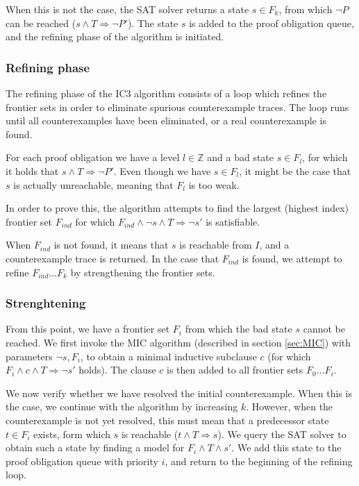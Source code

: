 \documentclass[a4paper]{article}
\begin{document}
When this is not the case, the SAT solver returns a state $s \in F_k$, from which $\lnot P$ can be reached ($s \land T \Rightarrow \lnot P'$). The state $s$ is added to the proof obligation queue, and the refining phase of the algorithm is initiated.

\subsubsection{Refining phase}
The refining phase of the IC3 algorithm consists of a loop which refines the frontier sets in order to eliminate spurious counterexample traces. The loop runs until all counterexamples have been eliminated, or a real counterexample is found.

For each proof obligation we have a level $l \in \mathbb{Z}$ and a bad state $s \in F_l$, for which it holds that $s \land T \Rightarrow \lnot P'$. Even though we have $s \in F_l$, it might be the case that $s$ is actually unreachable, meaning that $F_l$ is too weak.

In order to prove this, the algorithm attempts to find the largest (highest index) frontier set $F_{ind}$ for which $F_{ind} \land \lnot s \land T \Rightarrow \lnot s'$ is satisfiable.

When $F_{ind}$ is not found, it means that $s$ is reachable from $I$, and a counterexample trace is returned. In the case that $F_{ind}$ is found, we attempt to refine $F_{ind} \ldots F_k$ by strengthening the frontier sets.

\subsubsection{Strenghtening}
\label{sec:ic3_str}
From this point, we have a frontier set $F_i$ from which the bad state $s$ cannot be reached. We first invoke the MIC algorithm (described in section \ref{sec:MIC}) with parameters $\lnot s, F_i$, to obtain a minimal inductive subclause $c$ (for which $F_i \land c \land T \Rightarrow \lnot s'$ holds). The clause $c$ is then added to all frontier sets $F_0 \ldots F_i$.

We now verify whether we have resolved the initial counterexample. When this is the case, we continue with the algorithm by increasing $k$. However, when the counterexample is not yet resolved, this must mean that a predecessor state $t \in F_i$ exists, form which $s$ is reachable ($t \land T \Rightarrow s$). We query the SAT solver to obtain such a state by finding a model for $F_{i} \land T \land s'$. We add this state to the proof obligation queue with priority $i$, and return to the beginning of the refining loop.
\end{document}
